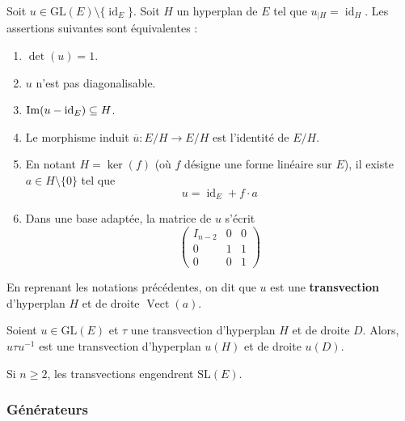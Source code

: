 
  \begin{proposition}
    Soit $u \in \mathrm{GL}(E) \setminus \{ \operatorname{id}_E \}$. Soit $H$ un hyperplan de $E$ tel que $u_{|H} = \operatorname{id}_H$. Les assertions suivantes sont équivalentes :
    \begin{enumerate}[label={\bfseries(\roman*)}]
      \item $\det(u) = 1$.
      \item $u$ n'est pas diagonalisable.
      \item $\mathrm{Im}(u - \operatorname{id}_E) \subseteq H$.
      \item Le morphisme induit $\overline{u} : E/H \rightarrow E/H$ est l'identité de $E/H$.
      \item En notant $H = \ker(f)$ (où $f$ désigne une forme linéaire sur $E$), il existe $a \in H \setminus \{ 0 \}$ tel que
      \[ u = \operatorname{id}_E + f \cdot a \]
      \item Dans une base adaptée, la matrice de $u$ s'écrit
      \[
      \begin{pmatrix}
        I_{n-2} & 0 & 0 \\
        0 & 1 & 1 \\
        0 & 0 & 1
      \end{pmatrix}
      \]
    \end{enumerate}
  \end{proposition}

  \begin{definition}
    En reprenant les notations précédentes, on dit que $u$ est une \textbf{transvection} d'hyperplan $H$ et de droite $\operatorname{Vect}(a)$.
  \end{definition}

  \begin{proposition}
    Soient $u \in \mathrm{GL}(E)$ et $\tau$ une transvection d'hyperplan $H$ et de droite $D$. Alors, $u \tau u^{-1}$ est une transvection d'hyperplan $u(H)$ et de droite $u(D)$.
  \end{proposition}

  \begin{theorem}
    Si $n \geq 2$, les transvections engendrent $\mathrm{SL}(E)$.
  \end{theorem}

  \subsubsection{Générateurs}

